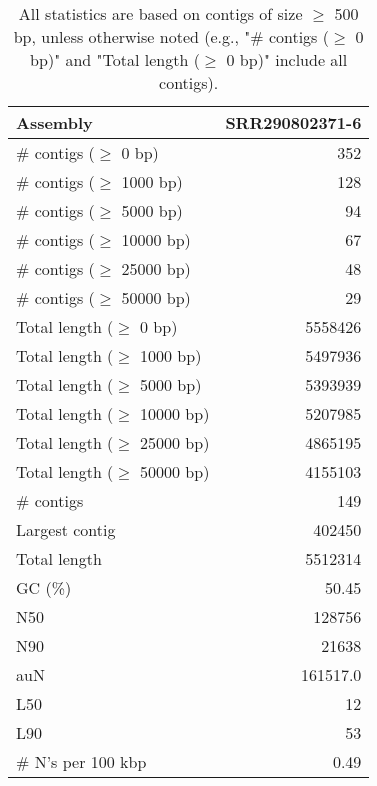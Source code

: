 \documentclass[12pt,a4paper]{article}
\begin{document}
\begin{table}[ht]
\begin{center}
\caption{All statistics are based on contigs of size $\geq$ 500 bp, unless otherwise noted (e.g., "\# contigs ($\geq$ 0 bp)" and "Total length ($\geq$ 0 bp)" include all contigs).}
\begin{tabular}{|l*{1}{|r}|}
\hline
Assembly & SRR290802371-6 \\ \hline
\# contigs ($\geq$ 0 bp) & 352 \\ \hline
\# contigs ($\geq$ 1000 bp) & 128 \\ \hline
\# contigs ($\geq$ 5000 bp) & 94 \\ \hline
\# contigs ($\geq$ 10000 bp) & 67 \\ \hline
\# contigs ($\geq$ 25000 bp) & 48 \\ \hline
\# contigs ($\geq$ 50000 bp) & 29 \\ \hline
Total length ($\geq$ 0 bp) & 5558426 \\ \hline
Total length ($\geq$ 1000 bp) & 5497936 \\ \hline
Total length ($\geq$ 5000 bp) & 5393939 \\ \hline
Total length ($\geq$ 10000 bp) & 5207985 \\ \hline
Total length ($\geq$ 25000 bp) & 4865195 \\ \hline
Total length ($\geq$ 50000 bp) & 4155103 \\ \hline
\# contigs & 149 \\ \hline
Largest contig & 402450 \\ \hline
Total length & 5512314 \\ \hline
GC (\%) & 50.45 \\ \hline
N50 & 128756 \\ \hline
N90 & 21638 \\ \hline
auN & 161517.0 \\ \hline
L50 & 12 \\ \hline
L90 & 53 \\ \hline
\# N's per 100 kbp & 0.49 \\ \hline
\end{tabular}
\end{center}
\end{table}
\end{document}
